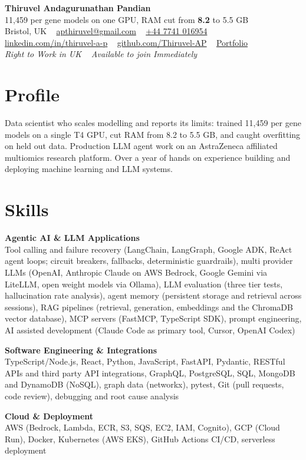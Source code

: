 \documentclass[a4paper,11pt]{article}
\newcommand{\skillgroup}[2]{{\color{navy}\textbf{#1}}\\ #2\par\vspace{3pt}}
\newcommand{\num}[1]{\textbf{#1}}   %
\begin{document}
\begin{center}
  {\fontsize{22}{26}\selectfont\bfseries\color{navy} Thiruvel Andagurunathan Pandian}\\[4pt]
  {\fontsize{12}{14}\selectfont\color{navy} 11,459 per gene models on one GPU, RAM cut from \num{8.2} to 5.5 GB}\\[4pt]
  {\small
  Bristol, UK\nobreak\ \,\textperiodcentered\, \href{mailto:apthiruvel@gmail.com}{apthiruvel@gmail.com}\nobreak\ \,\textperiodcentered\, \href{tel:+447741016954}{+44 7741 016954}\nobreak\ \,\textperiodcentered\, \href{https://www.linkedin.com/in/thiruvel-a-p/}{linkedin.com/in/thiruvel-a-p}\nobreak\ \,\textperiodcentered\, \href{https://github.com/Thiruvel-AP}{github.com/Thiruvel-AP}\nobreak\ \,\textperiodcentered\, \href{https://thiruvel-ap.github.io/PersonalPortfolio/}{Portfolio}}\\[3pt]
  {\small\itshape\color{muted} Right to Work in UK\nobreak\ \,\textperiodcentered\, Available to join Immediately}

\end{center}

\section{Profile}
Data scientist who scales modelling and reports its limits: trained 11,459 per gene models on a single T4 GPU, cut RAM from 8.2 to 5.5 GB, and caught overfitting on held out data. Production LLM agent work on an AstraZeneca affiliated multiomics research platform. Over a year of hands on experience building and deploying machine learning and LLM systems.

\section{Skills}
\skillgroup{Agentic AI \& LLM Applications}{Tool calling and failure recovery (LangChain, LangGraph, Google ADK, ReAct agent loops; circuit breakers, fallbacks, deterministic guardrails), multi provider LLMs (OpenAI, Anthropic Claude on AWS Bedrock, Google Gemini via LiteLLM, open weight models via Ollama), LLM evaluation (three tier tests, hallucination rate analysis), agent memory (persistent storage and retrieval across sessions), RAG pipelines (retrieval, generation, embeddings and the ChromaDB vector database), MCP servers (FastMCP, TypeScript SDK), prompt engineering, AI assisted development (Claude Code as primary tool, Cursor, OpenAI Codex)}
\skillgroup{Software Engineering \& Integrations}{TypeScript/Node.js, React, Python, JavaScript, FastAPI, Pydantic, RESTful APIs and third party API integrations, GraphQL, PostgreSQL, SQL, MongoDB and DynamoDB (NoSQL), graph data (networkx), pytest, Git (pull requests, code review), debugging and root cause analysis}
\skillgroup{Cloud \& Deployment}{AWS (Bedrock, Lambda, ECR, S3, SQS, EC2, IAM, Cognito), GCP (Cloud Run), Docker, Kubernetes (AWS EKS), GitHub Actions CI/CD, serverless deployment}
\end{document}
